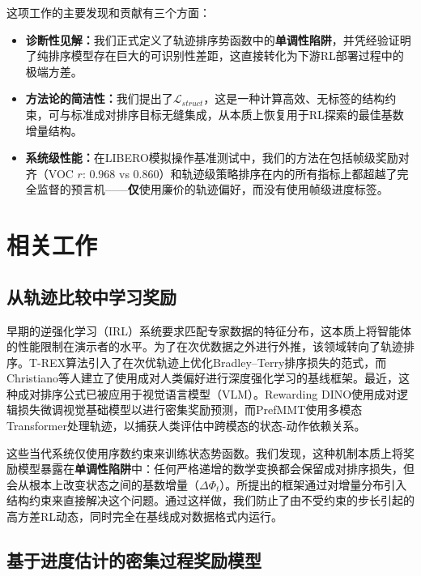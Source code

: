 这项工作的主要发现和贡献有三个方面：
\begin{itemize}[leftmargin=*,noitemsep]
    \item \textbf{诊断性见解：}我们正式定义了轨迹排序势函数中的\textbf{单调性陷阱}，并凭经验证明了纯排序模型存在巨大的可识别性差距，这直接转化为下游RL部署过程中的极端方差。
    \item \textbf{方法论的简洁性：}我们提出了$\mathcal{L}_{struct}$，这是一种计算高效、无标签的结构约束，可与标准成对排序目标无缝集成，从本质上恢复用于RL探索的最佳基数增量结构。
    \item \textbf{系统级性能：}在LIBERO模拟操作基准测试中，我们的方法在包括帧级奖励对齐（VOC $r$: $0.968$ vs $0.860$）和轨迹级策略排序在内的所有指标上都超越了完全监督的预言机——\textbf{仅}使用廉价的轨迹偏好，而没有使用帧级进度标签。
\end{itemize}



\clearpage
\section{相关工作}

\subsection{从轨迹比较中学习奖励}

早期的逆强化学习（IRL）系统要求匹配专家数据的特征分布，这本质上将智能体的性能限制在演示者的水平\cite{ziebart2008}。为了在次优数据之外进行外推，该领域转向了轨迹排序。T-REX算法\cite{brown2019}引入了在次优轨迹上优化Bradley--Terry排序损失\cite{bradley1952}的范式，而Christiano等人\cite{christiano2017}建立了使用成对人类偏好进行深度强化学习的基线框架。最近，这种成对排序公式已被应用于视觉语言模型（VLM）。Rewarding DINO\cite{krack2026}使用成对逻辑损失微调视觉基础模型以进行密集奖励预测，而PrefMMT\cite{zhao2025}使用多模态Transformer处理轨迹，以捕获人类评估中跨模态的状态-动作依赖关系。

这些当代系统仅使用序数约束来训练状态势函数。我们发现，这种机制本质上将奖励模型暴露在\textbf{单调性陷阱}中：任何严格递增的数学变换都会保留成对排序损失，但会从根本上改变状态之间的基数增量（$\Delta\Phi_t$）。所提出的框架通过对增量分布引入结构约束来直接解决这个问题。通过这样做，我们防止了由不受约束的步长引起的高方差RL动态，同时完全在基线成对数据格式内运行。

\subsection{基于进度估计的密集过程奖励模型}

